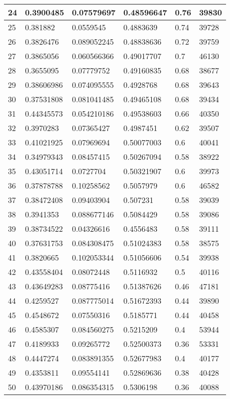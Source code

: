 \begin{longtable}{|l|l|l|l|l|l|}
24 & 0.3900485 & 0.07579697 & 0.48596647 & 0.76 & 39830 \\ \hline 
25 & 0.381882 & 0.0559545 & 0.4883639 & 0.74 & 39728 \\ \hline 
26 & 0.3826476 & 0.089052245 & 0.48838636 & 0.72 & 39759 \\ \hline 
27 & 0.3865056 & 0.060566366 & 0.49017707 & 0.7 & 46130 \\ \hline 
28 & 0.3655095 & 0.07779752 & 0.49160835 & 0.68 & 38677 \\ \hline 
29 & 0.38606986 & 0.074095555 & 0.4928768 & 0.68 & 39643 \\ \hline 
30 & 0.37531808 & 0.081041485 & 0.49465108 & 0.68 & 39434 \\ \hline 
31 & 0.44345573 & 0.054210186 & 0.49538603 & 0.66 & 40350 \\ \hline 
32 & 0.3970283 & 0.07365427 & 0.4987451 & 0.62 & 39507 \\ \hline 
33 & 0.41021925 & 0.07969694 & 0.50077003 & 0.6 & 40041 \\ \hline 
34 & 0.34979343 & 0.08457415 & 0.50267094 & 0.58 & 38922 \\ \hline 
35 & 0.43051714 & 0.0727704 & 0.50321907 & 0.6 & 39973 \\ \hline 
36 & 0.37878788 & 0.10258562 & 0.5057979 & 0.6 & 46582 \\ \hline 
37 & 0.38472408 & 0.09403904 & 0.507231 & 0.58 & 39039 \\ \hline 
38 & 0.3941353 & 0.088677146 & 0.5084429 & 0.58 & 39086 \\ \hline 
39 & 0.38734522 & 0.04326616 & 0.4556483 & 0.58 & 39111 \\ \hline 
40 & 0.37631753 & 0.084308475 & 0.51024383 & 0.58 & 38575 \\ \hline 
41 & 0.3820665 & 0.102053344 & 0.51056606 & 0.54 & 39938 \\ \hline 
42 & 0.43558404 & 0.08072448 & 0.5116932 & 0.5 & 40116 \\ \hline 
43 & 0.43649283 & 0.08775416 & 0.51387626 & 0.46 & 47181 \\ \hline 
44 & 0.4259527 & 0.087775014 & 0.51672393 & 0.44 & 39890 \\ \hline 
45 & 0.4548672 & 0.07550316 & 0.5185771 & 0.44 & 40458 \\ \hline 
46 & 0.4585307 & 0.084560275 & 0.5215209 & 0.4 & 53944 \\ \hline 
47 & 0.4189933 & 0.09265772 & 0.52500373 & 0.36 & 53331 \\ \hline 
48 & 0.4447274 & 0.083891355 & 0.52677983 & 0.4 & 40177 \\ \hline 
49 & 0.4353811 & 0.09554141 & 0.52869636 & 0.38 & 40428 \\ \hline 
50 & 0.43970186 & 0.086354315 & 0.5306198 & 0.36 & 40088 \\ \hline 
\end{longtable}